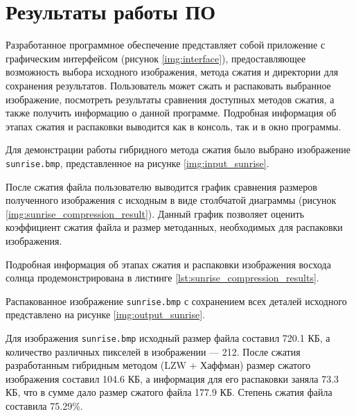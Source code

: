 \section{Результаты работы ПО}

Разработанное программное обеспечение представляет собой приложение с графическим интерфейсом (рисунок \ref{img:interface}), предоставляющее возможность выбора исходного изображения, метода сжатия и директории для сохранения результатов. Пользователь может сжать и распаковать выбранное изображение, посмотреть результаты сравнения доступных методов сжатия, а также получить информацию о данной программе.
Подробная информация об этапах сжатия и распаковки выводится как в консоль, так и в окно программы.


\clearpage

Для демонстрации работы гибридного метода сжатия было выбрано изображение \texttt{sunrise.bmp}, представленное на рисунке \ref{img:input_sunrise}.


После сжатия файла пользователю выводится график сравнения размеров полученного изображения с исходным в виде столбчатой диаграммы (рисунок \ref{img:sunrise_compression_result}). Данный график позволяет оценить коэффициент сжатия файла и размер методанных, необходимых для распаковки изображения.


Подробная информация об этапах сжатия и распаковки изображения восхода солнца продемонстрирована в листинге \ref{lst:sunrise_compression_results}.


Распакованное изображение \texttt{sunrise.bmp} с сохранением всех деталей исходного представлено на рисунке \ref{img:output_sunrise}.


Для изображения \texttt{sunrise.bmp} исходный размер файла составил 720.1 КБ, а количество различных пикселей в изображении --- 212. После сжатия разработанным гибридным методом (LZW + Хаффман) размер сжатого изображения составил 104.6 КБ, а информация для его распаковки заняла 73.3 КБ, что в сумме дало размер сжатого файла 177.9 КБ. Степень сжатия файла составила 75.29\%. 

